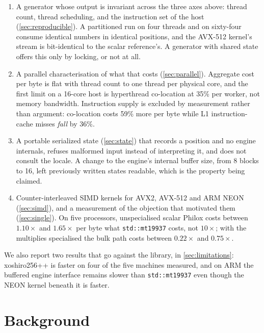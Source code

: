 \documentclass[acmsmall,screen,review]{acmart}
\theoremstyle{acmdefinition}
\newcommand{\code}[1]{\texttt{#1}}
\begin{document}
\begin{enumerate}
  \item A generator whose output is invariant across the three axes above:
        thread count, thread scheduling, and the instruction set of the host
        (\cref{sec:reproducible}). A partitioned run on four threads and on
        sixty-four consume identical numbers in identical positions, and the
        AVX-512 kernel's stream is bit-identical to the scalar reference's. A
        generator with shared state offers this only by locking, or not at all.
  \item A parallel characterisation of what that costs
        (\cref{sec:parallel}). Aggregate cost per byte is flat with thread
        count to one thread per physical core, and the first limit on a 16-core
        host is hyperthread co-location at 35\% per worker, not memory
        bandwidth. Instruction supply is excluded by measurement rather than
        argument: co-location costs 59\% more per byte while L1
        instruction-cache misses \emph{fall} by 36\%.
  \item A portable serialized state (\cref{sec:state}) that records a position
        and no engine internals, refuses malformed input instead of
        interpreting it, and does not consult the locale. A change to the
        engine's internal buffer size, from 8 blocks to 16, left previously
        written states readable, which is the property being claimed.
  \item Counter-interleaved SIMD kernels for AVX2, AVX-512 and ARM NEON
        (\cref{sec:simd}), and a measurement of the objection that motivated
        them (\cref{sec:single}). On five processors, unspecialised scalar
        Philox costs between $1.10\times$ and $1.65\times$ per byte what
        \code{std::mt19937} costs, not $10\times$; with the multiplies
        specialised the bulk path costs between $0.22\times$ and $0.75\times$.
\end{enumerate}

We also report two results that go against the library, in
\cref{sec:limitations}: xoshiro256++ is faster on four of the five machines
measured, and on ARM the buffered engine interface remains slower than
\code{std::mt19937} even though the NEON kernel beneath it is faster.

\section{Background}\label{sec:background}
\end{document}
